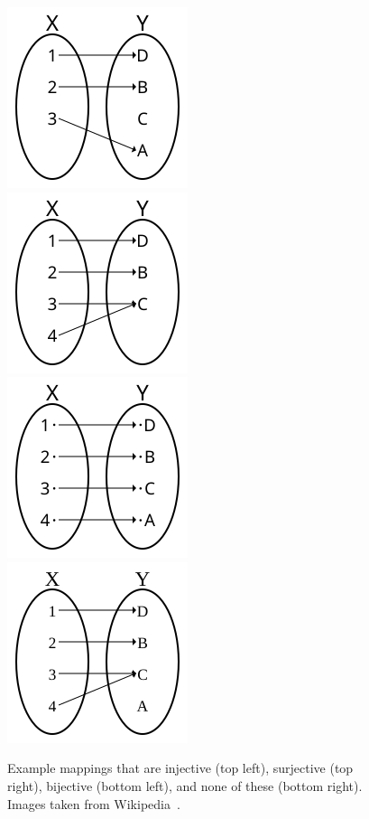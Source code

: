 \begin{figure}
\centering
\includegraphics[width=0.45\linewidth]{figs/Injection.png}~~~
\includegraphics[width=0.45\linewidth]{figs/Surjection.png}\\
\includegraphics[width=0.45\linewidth]{figs/Bijection.png}~~~
\includegraphics[width=0.45\linewidth]{figs/Not-Injection-Surjection.png}
\caption{Example mappings that are injective (top left), surjective (top right),
bijective (bottom left), and none of these (bottom right). Images taken from 
Wikipedia~\cite{wiki:bijection}.}
\label{fig:mapping}
\end{figure} 

